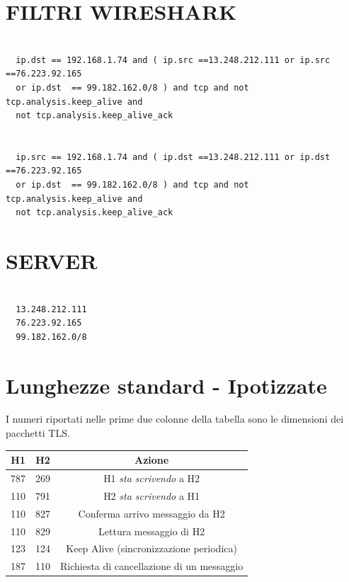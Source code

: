 \documentclass{article}
\begin{document}
  \begin{appendices}
  \section{FILTRI WIRESHARK}
  \begin{verbatim}
    
  ip.dst == 192.168.1.74 and ( ip.src ==13.248.212.111 or ip.src ==76.223.92.165 
  or ip.dst  == 99.182.162.0/8 ) and tcp and not tcp.analysis.keep_alive and
  not tcp.analysis.keep_alive_ack
  

  ip.src == 192.168.1.74 and ( ip.dst ==13.248.212.111 or ip.dst ==76.223.92.165
  or ip.dst  == 99.182.162.0/8 ) and tcp and not tcp.analysis.keep_alive and 
  not tcp.analysis.keep_alive_ack

  \end{verbatim}
  \section{SERVER}
  \begin{verbatim}

  13.248.212.111
  76.223.92.165
  99.182.162.0/8

  \end{verbatim}

  \section{Lunghezze standard - Ipotizzate}

  I numeri riportati nelle prime due colonne della tabella sono le dimensioni dei pacchetti
  TLS.
  \begin{center}
    \begin{tabular}{|| c | c | c ||} 
    \hline
    H1 & H2 & Azione \\ [0.5ex] 
    \hline\hline
    787 & 269 & H1 \textit{sta scrivendo} a H2 \\ 
    \hline
    110 & 791 & H2 \textit{sta scrivendo} a H1 \\
    \hline
    110 & 827 & Conferma arrivo messaggio da H2  \\
    \hline
    110 & 829 & Lettura messaggio di H2 \\
    \hline
    123 & 124 & Keep Alive (sincronizzazione periodica) \\ 
    \hline
    187 & 110 & Richiesta di cancellazione di un messaggio \\ [1ex]
    \hline
   \end{tabular}
   \end{center}
  
  \end{appendices}
\end{document}
